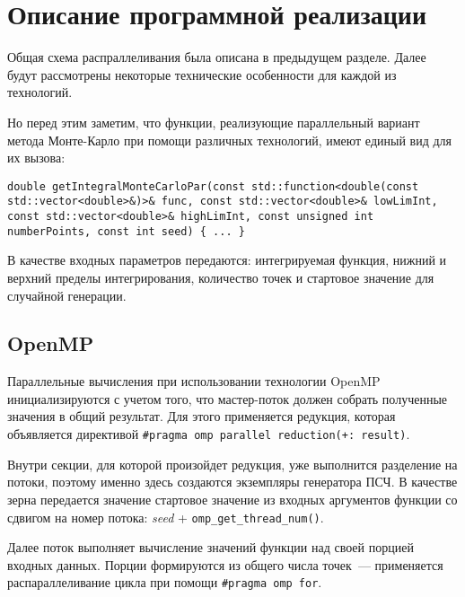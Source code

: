 \documentclass{report}
\begin{document}
\section*{Описание программной реализации}
Общая схема распраллеливания была описана в предыдущем разделе. Далее будут рассмотрены некоторые технические особенности для каждой из технологий.
\par Но перед этим заметим, что функции, реализующие параллельный вариант метода Монте-Карло при помощи различных технологий,  имеют единый вид для их вызова:
\begin{lstlisting}
double getIntegralMonteCarloPar(const std::function<double(const std::vector<double>&)>& func, const std::vector<double>& lowLimInt, const std::vector<double>& highLimInt, const unsigned int numberPoints, const int seed) { ... }
\end{lstlisting}
\par В качестве входных параметров передаются: интегрируемая функция, нижний и верхний пределы интегрирования, количество точек и стартовое значение для случайной генерации.

\subsection*{OpenMP}
Параллельные вычисления при использовании технологии OpenMP инициализируются с учетом того, что мастер-поток должен собрать полученные значения в общий результат. Для этого применяется редукция, которая объявляется директивой \verb|#pragma omp parallel reduction(+: result)|. 
\par Внутри секции, для которой произойдет редукция, уже выполнится разделение на потоки, поэтому именно здесь создаются экземпляры генератора ПСЧ. В качестве зерна передается значение стартовое значение из входных аргументов функции со сдвигом на номер потока: \emph{seed} + \verb|omp_get_thread_num()|.
\par Далее поток выполняет вычисление значений функции над своей порцией входных данных. Порции формируются из общего числа точек~--- применяется распараллеливание цикла при помощи \verb|#pragma omp for|.
\end{document}

